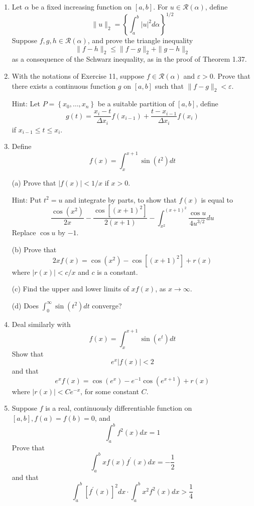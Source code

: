 \documentclass[10pt]{article}
\begin{document}
\begin{enumerate}
  (d) Show that Hölder's inequality is also true for the ``improper'' integrals described in Exercises 7 and 8.

  \item Let $\alpha$ be a fixed increasing function on $[a, b]$. For $u \in \mathscr{R}(\alpha)$, define
  $$
  \|u\|_{2}=\left\{\int_{a}^{b}|u|^{2} d \alpha\right\}^{1 / 2}
  $$
  Suppose $f, g, h \in \mathscr{R}(\alpha)$, and prove the triangle inequality
  $$
  \|f-h\|_{2} \leq\|f-g\|_{2}+\|g-h\|_{2}
  $$
  as a consequence of the Schwarz inequality, as in the proof of Theorem 1.37.

  \item With the notations of Exercise 11, suppose $f \in \mathscr{R}(\alpha)$ and $\varepsilon>0$. Prove that there exists a continuous function $g$ on $[a, b]$ such that $\|f-g\|_{2}<\varepsilon$.

  Hint: Let $P=\left\{x_{0}, \ldots, x_{n}\right\}$ be a suitable partition of $[a, b]$, define
  $$
  g(t)=\frac{x_{i}-t}{\Delta x_{i}} f\left(x_{i-1}\right)+\frac{t-x_{i-1}}{\Delta x_{i}} f\left(x_{i}\right)
  $$
  if $x_{i-1} \leq t \leq x_{i}$.

  \item Define
  $$
  f(x)=\int_{x}^{x+1} \sin \left(t^{2}\right) d t
  $$

  (a) Prove that $|f(x)|<1 / x$ if $x>0$.

  Hint: Put $t^{2}=u$ and integrate by parts, to show that $f(x)$ is equal to
  $$
  \frac{\cos \left(x^{2}\right)}{2 x}-\frac{\cos \left[(x+1)^{2}\right]}{2(x+1)}-\int_{x^{2}}^{(x+1)^{2}} \frac{\cos u}{4 u^{3 / 2}} d u
  $$
  Replace $\cos u$ by $-1$.

  (b) Prove that
  $$
  2 x f(x)=\cos \left(x^{2}\right)-\cos \left[(x+1)^{2}\right]+r(x)
  $$
  where $|r(x)|<c / x$ and $c$ is a constant.

  (c) Find the upper and lower limits of $x f(x)$, as $x \rightarrow \infty$.

  (d) Does $\int_{0}^{\infty} \sin \left(t^{2}\right) d t$ converge?

  \item Deal similarly with
  $$
  f(x)=\int_{x}^{x+1} \sin \left(e^{t}\right) d t
  $$
  Show that
  $$
  e^{x}|f(x)|<2
  $$
  and that
  $$
  e^{x} f(x)=\cos \left(e^{x}\right)-e^{-1} \cos \left(e^{x+1}\right)+r(x)
  $$
  where $|r(x)|<C e^{-x}$, for some constant $C$.

  \item Suppose $f$ is a real, continuously differentiable function on $[a, b], f(a)=f(b)=0$, and
  $$
  \int_{a}^{b} f^{2}(x) d x=1
  $$
  Prove that
  $$
  \int_{a}^{b} x f(x) f^{\prime}(x) d x=-\frac{1}{2}
  $$
  and that
  $$
  \int_{a}^{b}\left[f^{\prime}(x)\right]^{2} d x \cdot \int_{a}^{b} x^{2} f^{2}(x) d x>\frac{1}{4}
  $$


\end{enumerate}
\end{document}
